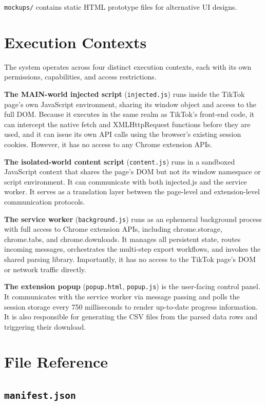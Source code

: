 \texttt{mockups/} contains static HTML prototype files for alternative UI designs.

\section{Execution Contexts}

The system operates across four distinct execution contexts, each with its own permissions, capabilities, and access restrictions.

\textbf{The MAIN-world injected script} (\texttt{injected.js}) runs inside the TikTok page's own JavaScript environment, sharing its window object and access to the full DOM. Because it executes in the same realm as TikTok's front-end code, it can intercept the native fetch and XMLHttpRequest functions before they are used, and it can issue its own API calls using the browser's existing session cookies. However, it has no access to any Chrome extension APIs.

\textbf{The isolated-world content script} (\texttt{content.js}) runs in a sandboxed JavaScript context that shares the page's DOM but not its window namespace or script environment. It can communicate with both injected.js and the service worker. It serves as a translation layer between the page-level and extension-level communication protocols.

\textbf{The service worker} (\texttt{background.js}) runs as an ephemeral background process with full access to Chrome extension APIs, including chrome.storage, chrome.tabs, and chrome.downloads. It manages all persistent state, routes incoming messages, orchestrates the multi-step export workflows, and invokes the shared parsing library. Importantly, it has no access to the TikTok page's DOM or network traffic directly.

\textbf{The extension popup} (\texttt{popup.html}, \texttt{popup.js}) is the user-facing control panel. It communicates with the service worker via message passing and polls the session storage every 750 milliseconds to render up-to-date progress information. It is also responsible for generating the CSV files from the parsed data rows and triggering their download.

\section{File Reference}

\subsection{\texttt{manifest.json}}

